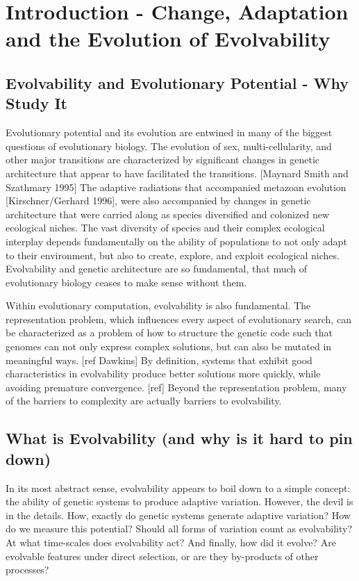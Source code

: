\section{Introduction - Change, Adaptation and the Evolution of Evolvability}
\subsection{Evolvability and Evolutionary Potential - Why Study It} 
Evolutionary potential and its evolution are entwined in many of the biggest questions of evolutionary biology. The evolution of sex, multi-cellularity, and other major transitions are characterized by significant changes in genetic architecture that appear to have facilitated the transitions. [Maynard Smith and Szathmary 1995] The adaptive radiations that accompanied metazoan evolution [Kirschner/Gerhard 1996], were also accompanied by changes in genetic architecture that were carried along as species diversified and colonized new ecological niches. The vast diversity of species and their complex ecological interplay depends fundamentally on the ability of populations to not only adapt to their environment, but also to create, explore, and exploit ecological niches. Evolvability and genetic architecture are so fundamental, that much of evolutionary biology ceases to make sense without them. 

Within evolutionary computation, evolvability is also fundamental. The representation problem, which influences every aspect of evolutionary search, can be characterized as a problem of how to structure the genetic code such that genomes can not only express complex solutions, but can also be mutated in meaningful ways. [ref Dawkins] By definition, systems that exhibit good characteristics in evolvability produce better solutions more quickly, while avoiding premature convergence. [ref] Beyond the representation problem, many of the barriers to complexity are actually barriers to evolvability.

\subsection{What is Evolvability (and why is it hard to pin down)}

In its most abstract sense, evolvability appears to boil down to a simple concept: the ability of genetic systems to produce adaptive variation. However, the devil is in the details.  How, exactly do genetic systems generate adaptive variation? How do we measure this potential? Should all forms of variation count as evolvability? At what time-scales does evolvability act?  And finally, how did it evolve? Are evolvable features under direct selection, or are they by-products of other processes?

